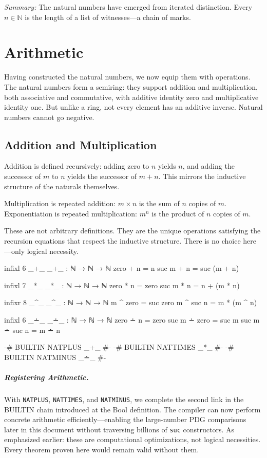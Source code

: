\documentclass[11pt,a4paper]{book}
\begin{document}
\medskip
\noindent\textit{Summary:} The natural numbers have emerged from iterated distinction. 
Every $n \in \mathbb{N}$ is the length of a list of witnesses—a chain of marks.

\chapter{Arithmetic}

Having constructed the natural numbers, we now equip them with operations. The natural 
numbers form a semiring: they support addition and multiplication, both associative and 
commutative, with additive identity zero and multiplicative identity one. But unlike a 
ring, not every element has an additive inverse. Natural numbers cannot go negative.

\section{Addition and Multiplication}

Addition is defined recursively: adding zero to $n$ yields $n$, and adding the successor 
of $m$ to $n$ yields the successor of $m + n$. This mirrors the inductive structure 
of the naturals themselves.

Multiplication is repeated addition: $m \times n$ is the sum of $n$ copies of $m$. 
Exponentiation is repeated multiplication: $m^n$ is the product of $n$ copies of $m$.

These are not arbitrary definitions. They are the unique operations satisfying the 
recursion equations that respect the inductive structure. There is no choice here—only 
logical necessity.

\begin{code}
infixl 6 _+_
_+_ : ℕ → ℕ → ℕ
zero  + n = n
suc m + n = suc (m + n)

infixl 7 _*_
_*_ : ℕ → ℕ → ℕ
zero  * n = zero
suc m * n = n + (m * n)

infixr 8 _^_
_^_ : ℕ → ℕ → ℕ
m ^ zero    = suc zero
m ^ suc n   = m * (m ^ n)

infixl 6 _∸_
_∸_ : ℕ → ℕ → ℕ
zero  ∸ n     = zero
suc m ∸ zero  = suc m
suc m ∸ suc n = m ∸ n

{-# BUILTIN NATPLUS  _+_ #-}
{-# BUILTIN NATTIMES _*_ #-}
{-# BUILTIN NATMINUS _∸_ #-}
\end{code}

\paragraph{Registering Arithmetic.}
With \texttt{NATPLUS}, \texttt{NATTIMES}, and \texttt{NATMINUS}, we complete the second 
link in the BUILTIN chain introduced at the Bool definition. The compiler can now perform 
concrete arithmetic efficiently—enabling the large-number PDG comparisons later in this 
document without traversing billions of \texttt{suc} constructors. As emphasized earlier: 
these are computational optimizations, not logical necessities. Every theorem proven here 
would remain valid without them.
\end{document}
